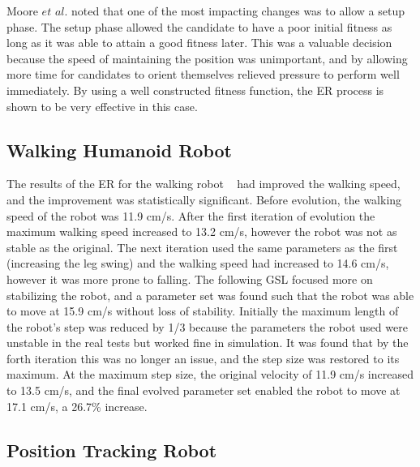 \documentclass{sig-alternate}
\begin{document}
  
  Moore $et$ $al.$ noted that one of the most impacting changes was to allow a setup phase. The setup phase allowed the candidate to have a poor initial fitness as long as it was able to attain a good fitness later. This was a valuable decision because the speed of maintaining the position was unimportant, and by allowing more time for candidates to orient themselves relieved pressure to perform well immediately.  By using a well constructed fitness function, the ER process is shown to be very effective in this case. 


  \subsection{Walking Humanoid Robot}\label{Farchy behavior}
  
	The results of the ER for the walking robot  ~\cite{Farchy:2013:HRL:2484920.2484930} had improved the walking speed, and the improvement was statistically significant. Before evolution, the walking speed of the robot was 11.9 cm/s. After the first iteration of evolution the maximum walking speed increased to 13.2 cm/s, however the robot was not as stable as the original. The next iteration used the same parameters as the first (increasing the leg swing) and the walking speed had increased to 14.6 cm/s, however it was more prone to falling. The following GSL focused more on stabilizing the robot, and a parameter set was found such that the robot was able to move at 15.9 cm/s without loss of stability. Initially the maximum length of the robot's step was reduced by 1/3 because the parameters the robot used were unstable in the real tests but worked fine in simulation. It was found that by the forth iteration this was no longer an issue, and the step size was restored to its maximum. At the maximum step size, the original velocity of 11.9 cm/s increased to 13.5 cm/s, and the final evolved parameter set enabled the robot to move at 17.1 cm/s, a 26.7\% increase.
	
	\subsection{Position Tracking Robot}\label{Pretorius behavior}
	
\end{document}
